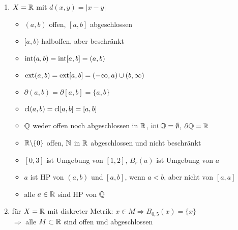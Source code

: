 \begin{example}
	\begin{enumerate}
		\item $X=\mathbb{R}$ mit $d(x,y)=\vert x-y\vert$
		\begin{itemize}
			\item $(a,b)$ offen, $[a,b]$ abgeschlossen
			\item $[a,b)$ halboffen, aber beschränkt
			\item $\operatorname{int} (a,b)=\operatorname{int} [a,b]=(a,b)$
			\item $\operatorname{ext} (a,b)=\operatorname{ext} [a,b]=(-\infty,a)\cup(b,\infty)$
			\item $\partial (a,b)=\partial [a,b]=\{a,b\}$
			\item $\operatorname{cl} (a,b)=\operatorname{cl} [a,b]=[a,b]$
			\item $\mathbb{Q}$ weder offen noch abgeschlossen in $\mathbb{R}$, $\operatorname{int}\mathbb{Q}=\emptyset$, $\partial\mathbb{Q}=\mathbb{R}$
			\item $\mathbb{R}\backslash\{0\}$ offen, $\mathbb{N}$ in $\mathbb{R}$ abgeschlossen und nicht beschränkt
			\item $[0,3]$ ist Umgebung von $[1,2]$, $B_r(a)$ ist Umgebung von $a$
			\item $a$ ist HP von $(a,b)$ und $[a,b]$, wenn $a<b$, aber nicht von $[a,a]$
			\item alle $a\in\mathbb{R}$ sind HP von $\mathbb{Q}$
		\end{itemize}
	\item für $X=\mathbb{R}$ mit diskreter Metrik: $x\in M\Rightarrow B_{0,5}(x)=\{x\}$ \\
	$\Rightarrow$ alle $M\subset\mathbb{R}$ sind offen und abgeschlossen
	\end{enumerate}
\end{example}

